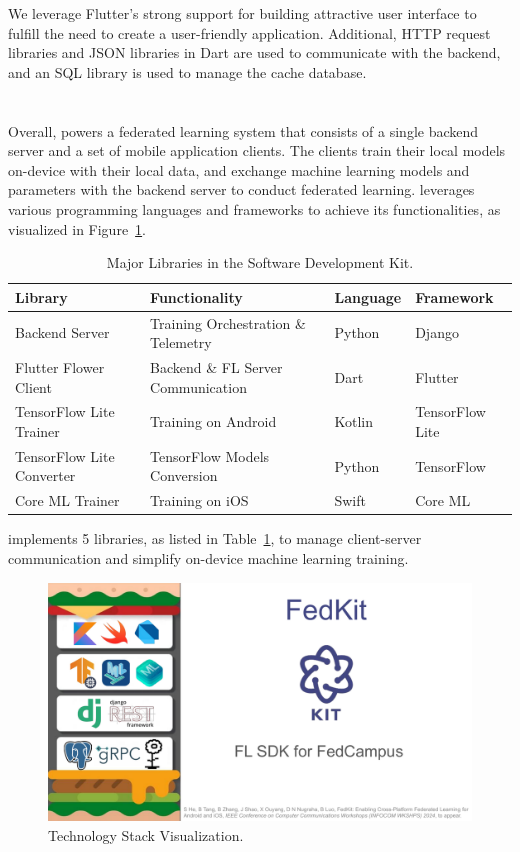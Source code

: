 We leverage Flutter's strong support for
building attractive user interface to fulfill the need to
create a user-friendly application.
Additional, HTTP request libraries and JSON libraries in Dart are used to
communicate with the backend,
and an SQL library is used to manage the cache database.

\section{\fedkit}

Overall, \fedkit powers a federated learning system that
consists of a single backend server and a set of mobile application clients.
The clients train their local models on-device with their local data,
and exchange machine learning models and parameters with the backend server to
conduct federated learning.
\fedkit leverages various programming languages and frameworks to achieve its
functionalities, as visualized in Figure~\ref{fig:stack-viz}.

\begin{table}\begin{center}
        \begin{tabular}{llll}
            Library                   & Functionality                       & Language & Framework       \\\hline
            Backend Server            & Training Orchestration \& Telemetry & Python   & Django          \\
            Flutter Flower Client     & Backend \& FL Server Communication  & Dart     & Flutter         \\
            TensorFlow Lite Trainer   & Training on Android                 & Kotlin   & TensorFlow Lite \\
            TensorFlow Lite Converter & TensorFlow Models Conversion        & Python   & TensorFlow      \\
            Core ML Trainer           & Training on iOS                     & Swift    & Core ML
        \end{tabular}
        \caption{Major Libraries in the \fedkit Software Development Kit.}
        \label{table:libs}
    \end{center}\end{table}

\fedkit implements 5 libraries, as listed in Table~\ref{table:libs},
to manage client-server communication and simplify on-device machine learning
training.

\begin{figure}\begin{center}
        \includegraphics[width=0.4\linewidth]{stack_visualization.pdf}
        \caption{\fedkit Technology Stack Visualization.}
        \label{fig:stack-viz}
    \end{center}\end{figure}

